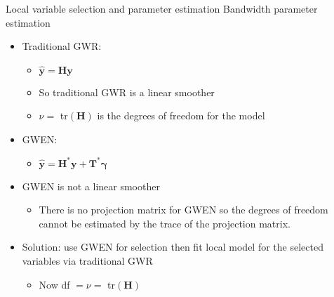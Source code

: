 \documentclass[12pt,t,handout]{beamer}
\newcommand{\subt}[1]{{\footnotesize \color{subtitle} {#1}}}
\begin{document}
\begin{comment}
\begin{frame}{Local variable selection and  parameter estimation}
\subt{Bandwidth parameter estimation}

\bigskip
Letting $H_i = \bm{W}_i \bm{X}\left(\bm{X}'\bm{W}_i\bm{X}\right)^{-1}\bm{X}'$, where $\bm{W}_i$ is the diagonal weight matrix diag$(w_{ii'})$,
 
\begin{align*}
  \hat{\bm{y}} = \bm{H} \bm{y}
\end{align*}

\note{note}
\end{frame}
\end{comment}



\begin{frame}{Local variable selection and  parameter estimation}
\subt{Bandwidth parameter estimation}

\bigskip 
\begin{itemize}
  \item Traditional GWR:
  \begin{itemize}
    \item $\hat{\bm{y}} = \bm{H} \bm{y}$
    \item So traditional GWR is a linear smoother
    \item $\nu = $ tr$(\bm{H})$ is the degrees of freedom for the model
  \end{itemize}

  \item GWEN:
  \begin{itemize}
    \item $\hat{\bm{y}} = \bm{H}^{*}\bm{y} + \bm{T}^{*}\bm{\gamma}$
  \end{itemize}  
  \item GWEN is not a linear smoother
  \begin{itemize}
    \item There is no projection matrix for GWEN so the degrees of freedom cannot be estimated by the trace of the projection matrix.
  \end{itemize} 
  \item Solution: use GWEN for selection then fit local model for the selected variables via traditional GWR
  \begin{itemize}
    \item Now df $= \nu = $ tr$(\bm{H})$
  \end{itemize} 
\end{itemize}


\end{frame}
\end{document}
